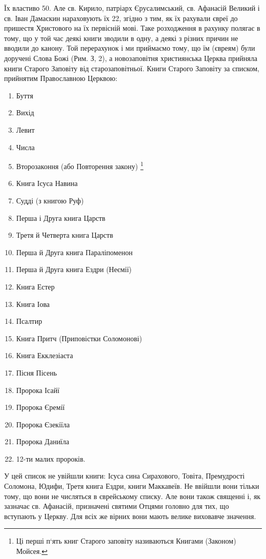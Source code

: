 \documentclass[main.tex]{subfiles}
\begin{document}
Їх властиво 50. Але св. Кирило, патріарх Єрусалимський, св. Афанасій Великий і св. Іван Дамаскин нараховують їх 22, згідно з тим, як їх рахували євреї до пришестя Христового на їх первісній мові. Таке розходження в рахунку полягає в тому, що у той час деякі книги зводили в одну, а деякі з різних причин не вводили до канону. Той перерахунок і ми приймаємо тому, що їм (євреям) були доручені Слова Божі (Рим. З, 2), а новозаповітня християнська Церква прийняла книги Старого Заповіту від старозаповітньої.
Книги Старого Заповіту за списком, прийнятим Православною Церквою:
\begin{enumerate}
    \item Буття
    \item Вихід
    \item Левит
    \item Числа
    \item Второзаконня (або Повторення закону) \footnote{Ці перші п`ять книг Старого заповіту називаються Книгами (Законом) Мойсея.}
    \item Книга Ісуса Навина
    \item Судді (з книгою Руф)
    \item Перша і Друга книга Царств
    \item Третя й Четверта книга Царств
    \item Перша й Друга книга Параліпоменон
    \item Перша й Друга книга Ездри (Неємії)
    \item Книга Естер
    \item Книга Іова
    \item Псалтир
    \item Книга Притч (Приповістки Соломонові)
    \item Книга Екклезіаста
    \item Пісня Пісень
    \item Пророка Ісайї
    \item Пророка Єремії
    \item Пророка Єзекіїла
    \item Пророка Даниїла
    \item 12-ти малих пророків.
\end{enumerate} 

У цей список не увійшли книги: Ісуса сина Сирахового, Товіта, Премудрості Соломона, Юдифи, Третя книга Ездри, книги Маккавеїв. Не ввійшли вони тільки тому, що вони не числяться в єврейському списку. Але вони також священні і, як зазначає св. Афанасій, призначені святими Отцями головно для тих, що вступають у Церкву. Для всіх же вірних вони мають велике виховавче значення.
\end{document}
